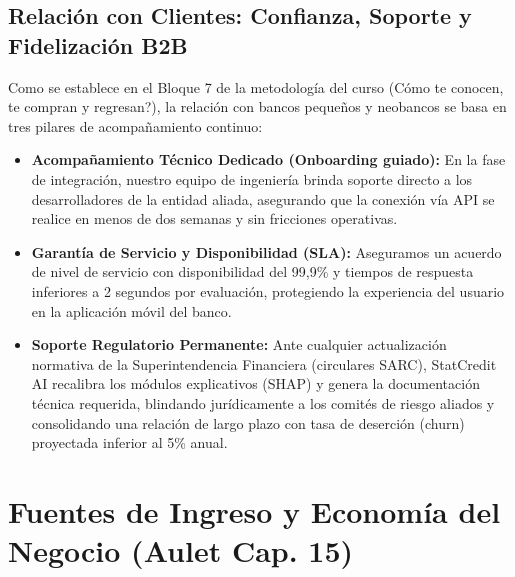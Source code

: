 \documentclass[11pt,a4paper]{article}
\begin{document}
\subsection{Relaci\'on con Clientes: Confianza, Soporte y Fidelizaci\'on B2B}
Como se establece en el Bloque 7 de la metodolog\'ia del curso (\textquestiondown C\'omo te conocen, te compran y regresan?), la relaci\'on con bancos peque\~nos y neobancos se basa en tres pilares de acompa\~namiento continuo:
\begin{itemize}[leftmargin=*]
    \item \textbf{Acompa\~namiento T\'ecnico Dedicado (Onboarding guiado):} En la fase de integraci\'on, nuestro equipo de ingenier\'ia brinda soporte directo a los desarrolladores de la entidad aliada, asegurando que la conexi\'on v\'ia API se realice en menos de dos semanas y sin fricciones operativas.
    \item \textbf{Garant\'ia de Servicio y Disponibilidad (SLA):} Aseguramos un acuerdo de nivel de servicio con disponibilidad del 99,9\% y tiempos de respuesta inferiores a 2 segundos por evaluaci\'on, protegiendo la experiencia del usuario en la aplicaci\'on m\'ovil del banco.
    \item \textbf{Soporte Regulatorio Permanente:} Ante cualquier actualizaci\'on normativa de la Superintendencia Financiera (circulares SARC), StatCredit AI recalibra los m\'odulos explicativos (SHAP) y genera la documentaci\'on t\'ecnica requerida, blindando jur\'idicamente a los comit\'es de riesgo aliados y consolidando una relaci\'on de largo plazo con tasa de deserci\'on (churn) proyectada inferior al 5\% anual.
\end{itemize}

\newpage

\section{Fuentes de Ingreso y Econom\'ia del Negocio (Aulet Cap. 15)}
\end{document}
